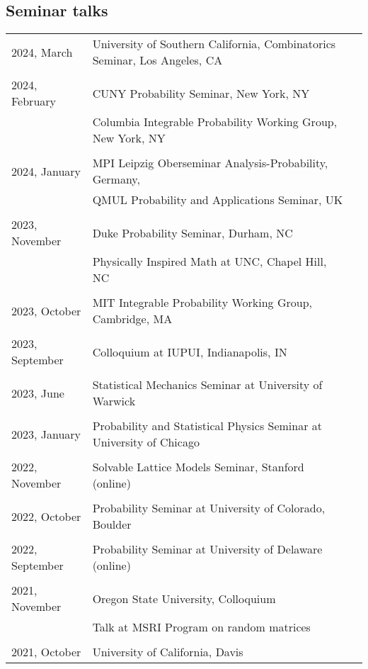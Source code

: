 \documentclass[letterpaper,11pt]{article}
\begin{document}
\subsection*{Seminar talks}

\begin{longtable}{llc}
	2024, March
	& University of Southern California,
	Combinatorics Seminar, Los Angeles, CA
	\\\\
	2024, February
	& CUNY Probability Seminar, New York, NY
	\\
	& Columbia Integrable Probability Working Group, New York, NY
	\\\\
	2024, January
	& MPI Leipzig Oberseminar Analysis-Probability, Germany,
	\\
	& QMUL Probability and Applications Seminar, UK
	\\\\
	2023, November
	& Duke Probability Seminar, Durham, NC
	\\
	& Physically Inspired Math at UNC, Chapel Hill, NC
	\\\\
	2023, October
	& MIT Integrable Probability Working Group, Cambridge, MA
	\\\\
	2023, September
	& Colloquium at IUPUI, Indianapolis, IN
	\\\\
	2023, June
	& Statistical Mechanics Seminar at University of Warwick
	\\\\
	2023, January
	& Probability and Statistical Physics Seminar at University of Chicago
	\\\\
	2022, November
	& Solvable Lattice Models Seminar, Stanford (online)
	\\\\
	2022, October
	& Probability Seminar at University of Colorado, Boulder
	\\\\
	2022, September
	& Probability Seminar at University of Delaware (online)
	\\\\
	2021, November
	& Oregon State University, Colloquium
	\\
	& Talk at MSRI Program on random matrices
	\\\\
	2021, October
	& University of California, Davis
	\\

\end{longtable}
\end{document}
